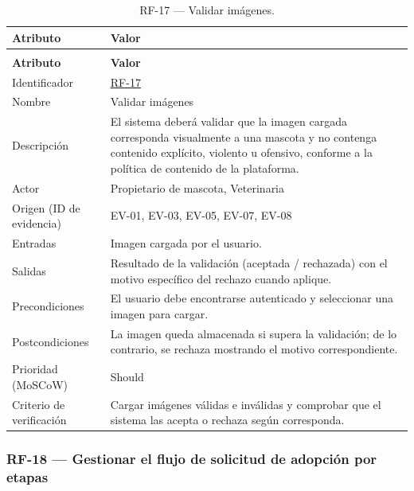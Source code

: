 \documentclass[journal,onecolumn]{IEEEtran}
\makeatletter
\newenvironment{atributos}[2]{%
	\small
	\begin{longtable}{@{}>{\raggedright\arraybackslash}p{4.2cm} >{\raggedright\arraybackslash}p{11.2cm}@{}}
		\caption{#2}\label{tab:#1}\\
		\toprule
		\textbf{Atributo} & \textbf{Valor} \\
		\midrule
		\endfirsthead
		\multicolumn{2}{@{}l}{\small\itshape (continuación)}\\
		\toprule
		\textbf{Atributo} & \textbf{Valor} \\
		\midrule
		\endhead
		\bottomrule
		\endlastfoot
	}{%
	\end{longtable}
	\normalsize
}
\makeatother
\begin{document}
	\begin{atributos}{RF-17}{RF-17 --- Validar imágenes.}
		Identificador & \hyperref[tab:RF-17]{RF-17} \\
		Nombre & Validar imágenes \\
		Descripción & El sistema deberá validar que la imagen cargada corresponda visualmente a una mascota y no contenga contenido explícito, violento u ofensivo, conforme a la política de contenido de la plataforma. \\
		Actor & Propietario de mascota, Veterinaria \\
		Origen (ID de evidencia) & EV-01, EV-03, EV-05, EV-07, EV-08 \\
		Entradas & Imagen cargada por el usuario. \\
		Salidas & Resultado de la validación (aceptada / rechazada) con el motivo específico del rechazo cuando aplique. \\
		Precondiciones & El usuario debe encontrarse autenticado y seleccionar una imagen para cargar. \\
		Postcondiciones & La imagen queda almacenada si supera la validación; de lo contrario, se rechaza mostrando el motivo correspondiente. \\
		Prioridad (MoSCoW) & Should \\
		Criterio de verificación & Cargar imágenes válidas e inválidas y comprobar que el sistema las acepta o rechaza según corresponda. \\
	\end{atributos}
	
	\subsubsection{RF-18 --- Gestionar el flujo de solicitud de adopción por etapas}
	
\end{document}
